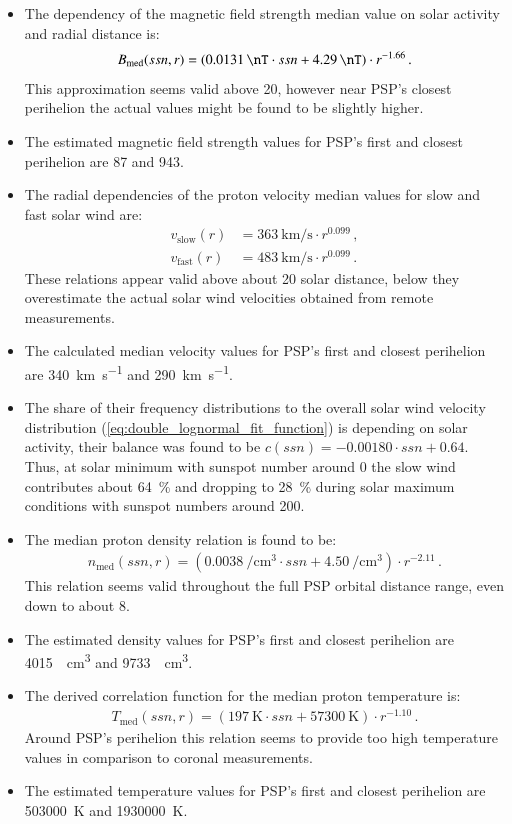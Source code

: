 \begin{itemize}
	\item The dependency of the magnetic field strength median value on solar activity and radial distance is:
	\begin{align}
		B_\text{med}(ssn,r) = (\SI{0.0131}{\nT} \cdot ssn + \SI{4.29}{\nT}) \cdot r^{-1.66}	\,.
	\end{align}
	This approximation seems valid above \SI{20}{\Rs}, however near PSP's closest perihelion the actual values might be found to be slightly higher.
	\item The estimated  magnetic field strength values for PSP's first and closest perihelion are \SI{87}{\nT} and \SI{943}{\nT}.	
	\item The radial dependencies of the proton velocity median values for slow and fast solar wind are:
	\begin{align}
		v_\text{slow}(r) &= \SI{363}{\km\per\s} \cdot r^{0.099}	\,,\\
		v_\text{fast}(r) &= \SI{483}{\km\per\s} \cdot r^{0.099}	\,.
	\end{align}
	These relations appear valid above about \SI{20}{\Rs} solar distance, below they overestimate the actual solar wind velocities obtained from remote measurements.
	\item The calculated median velocity values for PSP's first and closest perihelion are \SI{340}{\km\per\s} and \SI{290}{\km\per\s}.

	\item The share of their frequency distributions to the overall solar wind velocity distribution (\ref{eq:double_lognormal_fit_function}) is depending on solar activity, their balance was found to be $c(ssn) = -0.00180 \cdot ssn + 0.64$. Thus, at solar minimum with sunspot number around 0 the slow wind contributes about \SI{64}{\%} and dropping to \SI{28}{\%} during solar maximum conditions with sunspot numbers around 200.
	\item The median proton density relation is found to be:
	\begin{align}
		n_\text{med}(ssn,r) = \left(\SI{0.0038}{\per\cm\cubed} \cdot ssn + \SI{4.50}{\per\cm\cubed}\right) \cdot r^{-2.11}	\,.
	\end{align}
	This relation seems valid throughout the full PSP orbital distance range, even down to about \SI{8}{\Rs}.
	\item The estimated density values for PSP's first and closest perihelion are \SI{4015}{\per\cm\cubed} and \SI{9733}{\per\cm\cubed}.
	\item The derived correlation function for the median proton temperature is:
	\begin{align}
		T_\text{med}(ssn,r) = (\SI{197}{\K} \cdot ssn + \SI{57300}{\K}) \cdot r^{-1.10}	\,.
	\end{align}
	Around PSP’s perihelion this relation seems to provide too high temperature values in comparison to coronal measurements.
	\item The estimated temperature values for PSP's first and closest perihelion are \SI{503000}{\K} and \SI{1930000}{\K}.
\end{itemize}
